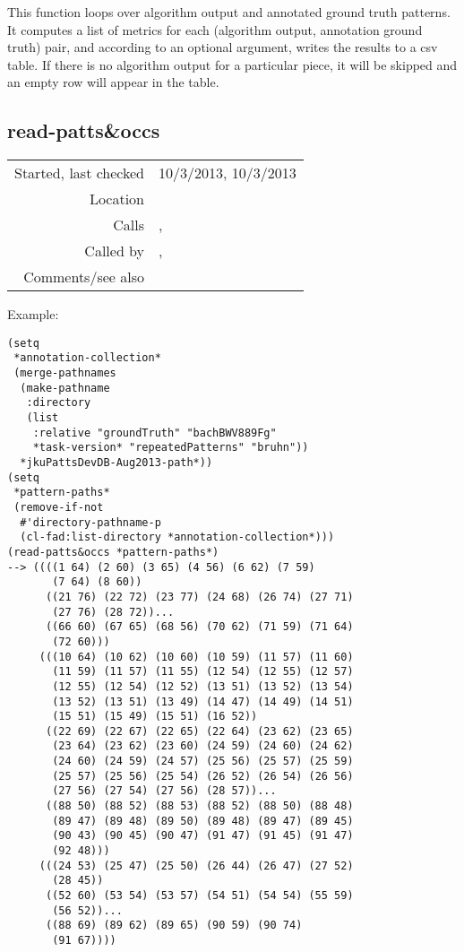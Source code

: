 \noindent This function loops over algorithm output
and annotated ground truth patterns. It computes a
list of metrics for each (algorithm output, annotation
ground truth) pair, and according to an optional
argument, writes the results to a csv table. If there
is no algorithm output for a particular piece, it will
be skipped and an empty row will appear in the
table.


\subsection*{read-patts\&occs}\label{fun:read-pattsnoccs}

\vspace{0.3cm}
\begin{tabular}{r|p{8cm}}
Started, last checked & 10/3/2013, 10/3/2013 \\
Location & \nameref{sec:evaluate-discovered-versus-annotated-patterns} \\
Calls & \nameref{fun:csv2dataset}, \nameref{fun:read-from-file} \\
Called by & \nameref{fun:read-ground-truth-for-piece},\newline \nameref{fun:metrics-for-algorithmnpiece} \\
Comments/see also &
\end{tabular}

\vspace{0.5cm}
\noindent Example:
\begin{verbatim}
(setq
 *annotation-collection*
 (merge-pathnames
  (make-pathname
   :directory
   (list
    :relative "groundTruth" "bachBWV889Fg"
    *task-version* "repeatedPatterns" "bruhn"))
  *jkuPattsDevDB-Aug2013-path*))
(setq
 *pattern-paths*
 (remove-if-not
  #'directory-pathname-p
  (cl-fad:list-directory *annotation-collection*)))
(read-patts&occs *pattern-paths*)
--> ((((1 64) (2 60) (3 65) (4 56) (6 62) (7 59)
       (7 64) (8 60))
      ((21 76) (22 72) (23 77) (24 68) (26 74) (27 71)
       (27 76) (28 72))...
      ((66 60) (67 65) (68 56) (70 62) (71 59) (71 64)
       (72 60)))
     (((10 64) (10 62) (10 60) (10 59) (11 57) (11 60)
       (11 59) (11 57) (11 55) (12 54) (12 55) (12 57)
       (12 55) (12 54) (12 52) (13 51) (13 52) (13 54)
       (13 52) (13 51) (13 49) (14 47) (14 49) (14 51)
       (15 51) (15 49) (15 51) (16 52))
      ((22 69) (22 67) (22 65) (22 64) (23 62) (23 65)
       (23 64) (23 62) (23 60) (24 59) (24 60) (24 62)
       (24 60) (24 59) (24 57) (25 56) (25 57) (25 59)
       (25 57) (25 56) (25 54) (26 52) (26 54) (26 56)
       (27 56) (27 54) (27 56) (28 57))...
      ((88 50) (88 52) (88 53) (88 52) (88 50) (88 48)
       (89 47) (89 48) (89 50) (89 48) (89 47) (89 45)
       (90 43) (90 45) (90 47) (91 47) (91 45) (91 47)
       (92 48)))
     (((24 53) (25 47) (25 50) (26 44) (26 47) (27 52)
       (28 45))
      ((52 60) (53 54) (53 57) (54 51) (54 54) (55 59)
       (56 52))...
      ((88 69) (89 62) (89 65) (90 59) (90 74)
       (91 67))))
\end{verbatim}

